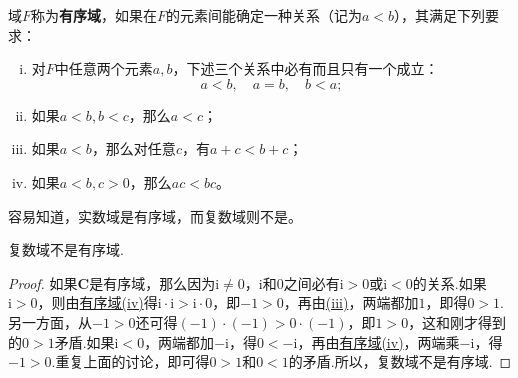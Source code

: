 \documentclass[../../main.tex]{subfiles}
\begin{document}
\begin{definition}[有序域]\label{definition:有序域}
域\(F\)称为\textbf{有序域}，如果在\(F\)的元素间能确定一种关系（记为\(a < b\)），其满足下列要求：
\begin{enumerate}[(i)]
\item\label{有序域:(i)} 对\(F\)中任意两个元素\(a,b\)，下述三个关系中必有而且只有一个成立：
\[
a < b, \quad a = b, \quad b < a;
\]

\item\label{有序域:(ii)} 如果\(a < b, b < c\)，那么\(a < c\)；

\item\label{有序域:(iii)} 如果\(a < b\)，那么对任意\(c\)，有\(a + c < b + c\)；

\item\label{有序域:(iv)} 如果\(a < b, c > 0\)，那么\(ac < bc\)。
\end{enumerate}
\end{definition}
\begin{note}
容易知道，实数域是有序域，而复数域则不是。
\end{note}

\begin{theorem}\label{theorem:复数域不是有序域}
复数域不是有序域.
\end{theorem}
\begin{proof}
如果\(\mathbf{C}\)是有序域，那么因为\(\mathrm{i} \neq 0\)，\(\mathrm{i}\)和\(0\)之间必有\(\mathrm{i} > 0\)或\(\mathrm{i} < 0\)的关系.如果\(\mathrm{i} > 0\)，则由\hyperref[definition:有序域]{有序域(iv)}得\(\mathrm{i} \cdot \mathrm{i} > \mathrm{i} \cdot 0\)，即\(-1 > 0\)，再由\hyperref[有序域:(iii)]{(iii)}，两端都加\(1\)，即得\(0 > 1\).另一方面，从\(-1 > 0\)还可得\((-1) \cdot (-1) > 0 \cdot (-1)\)，即\(1 > 0\)，这和刚才得到的\(0 > 1\)矛盾.如果\(\mathrm{i} < 0\)，两端都加\(-\mathrm{i}\)，得\(0 < -\mathrm{i}\)，再由\hyperref[definition:有序域]{有序域(iv)}，两端乘\(-\mathrm{i}\)，得\(-1 > 0\).重复上面的讨论，即可得\(0 > 1\)和\(0 < 1\)的矛盾.所以，复数域不是有序域. 
\end{proof}
\end{document}
